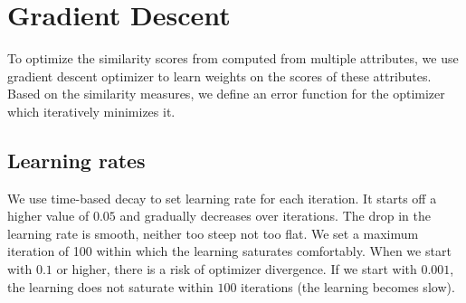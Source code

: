 \section{Gradient Descent}
To optimize the similarity scores from computed from multiple attributes, we use gradient descent optimizer to learn weights on the scores of these attributes. Based on the similarity measures, we define an error function for the optimizer which iteratively minimizes it.

\subsection{Learning rates}
We use time-based decay to set learning rate for each iteration. It starts off a higher value of $0.05$ and gradually decreases over iterations. The drop in the learning rate is smooth, neither too steep not too flat. We set a maximum iteration of 100 within which the learning saturates comfortably. When we start with $0.1$ or higher, there is a risk of optimizer divergence. If we start with $0.001$, the learning does not saturate within $100$ iterations (the learning becomes slow). 
